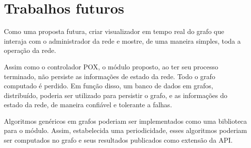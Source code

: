\chapter{Trabalhos futuros}
\label{chap:future-work}

Como uma proposta futura, criar visualizador em tempo real do grafo que 
interaja com o administrador da rede e mostre, de uma maneira simples, 
toda a operação da rede.

Assim como o controlador POX, o módulo proposto, ao ter seu processo terminado,
não persiste as informações de estado da rede.
Todo o grafo computado é perdido.
Em função disso, um banco de dados em grafos, distribuído, poderia ser 
utilizado para persistir o grafo, e as informações do estado da rede, de 
maneira confiável e tolerante a falhas. 

Algoritmos genéricos em grafos poderiam ser implementados como uma biblioteca
para o módulo.
Assim, estabelecida uma periodicidade, esses algoritmos poderiam ser computados
no grafo e seus resultados publicados como extensão da API.
